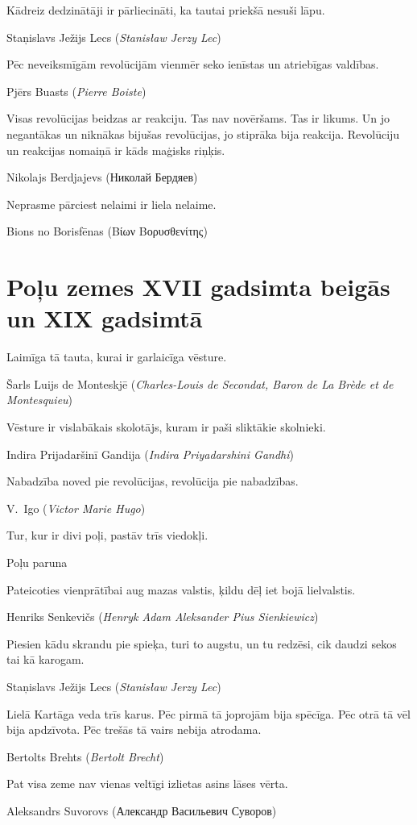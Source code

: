 \documentclass[twoside,a5paper,12pt,fleqn,openany]{extbook}
\newcommand{\pltxti}[1]{\textit{\textpolish{#1}}}
\newcommand{\rutxti}[1]{\textrussian{#1}}
\newcommand{\detxti}[1]{\textit{\textgerman{#1}}}
\newcommand{\frtxti}[1]{\textit{\textfrench{#1}}}
\newcommand{\entxti}[1]{\textit{\textenglish{#1}}}
\newcommand{\eltxti}[1]{\textgreek{#1}}
\begin{document}
\epigraph
{Kādreiz dedzinātāji ir pārliecināti, ka tautai priekšā nesuši lāpu.}
{Staņislavs Ježijs Lecs (\pltxti{Stanisław Jerzy Lec})}

\epigraph
{Pēc neveiksmīgām revolūcijām vienmēr seko ienīstas un atriebīgas valdības.}
{Pjērs Buasts (\frtxti{Pierre Boiste})}

\epigraph
{Visas revolūcijas beidzas ar reakciju. Tas nav novēršams. Tas ir likums. Un jo negantākas un niknākas bijušas revolūcijas, jo stiprāka bija reakcija. Revolūciju un reakcijas nomaiņā ir kāds maģisks riņķis.}
{Nikolajs Berdjajevs (\rutxti{Николай Бердяев})}



\epigraph
{Neprasme pārciest nelaimi ir liela nelaime.}
{Bions no Borisfēnas (\eltxti{Βίων Βορυσθενίτης})}

\section{Poļu zemes XVII gadsimta beigās un XIX gadsimtā}

\epigraph
{Laimīga tā tauta, kurai ir garlaicīga vēsture.}
{Šarls Luijs de Monteskjē (\frtxti{Charles-Louis de Secondat, Baron de La Brède et de Montesquieu})}

\epigraph
{Vēsture ir vislabākais skolotājs, kuram ir paši sliktākie skolnieki.}
{Indira Prijadaršinī Gandija (\entxti{Indira Priyadarshini Gandhi})}

\epigraph
{Nabadzība noved pie revolūcijas, revolūcija pie nabadzības.}
{V.~Igo (\frtxti{Victor Marie Hugo})}

\epigraph
{Tur, kur ir divi poļi, pastāv trīs viedokļi.}
{Poļu paruna}

\epigraph
{Pateicoties vienprātībai aug mazas valstis, ķildu dēļ iet bojā lielvalstis.}
{Henriks Senkevičs (\pltxti{Henryk Adam Aleksander Pius Sienkiewicz})}



\epigraph
{Piesien kādu skrandu pie spieķa, turi to augstu, un tu redzēsi, cik daudzi sekos tai kā karogam.}
{Staņislavs Ježijs Lecs (\pltxti{Stanisław Jerzy Lec})}

\epigraph
{Lielā Kartāga veda trīs karus. Pēc pirmā tā joprojām bija spēcīga. Pēc otrā tā vēl bija apdzīvota. Pēc trešās tā vairs nebija atrodama.}
{Bertolts Brehts (\detxti{Bertolt Brecht})}

\epigraph
{Pat visa zeme nav vienas veltīgi izlietas asins lāses vērta.}
{Aleksandrs Suvorovs (\rutxti{Александр Васильевич Суворов})}
\end{document}
